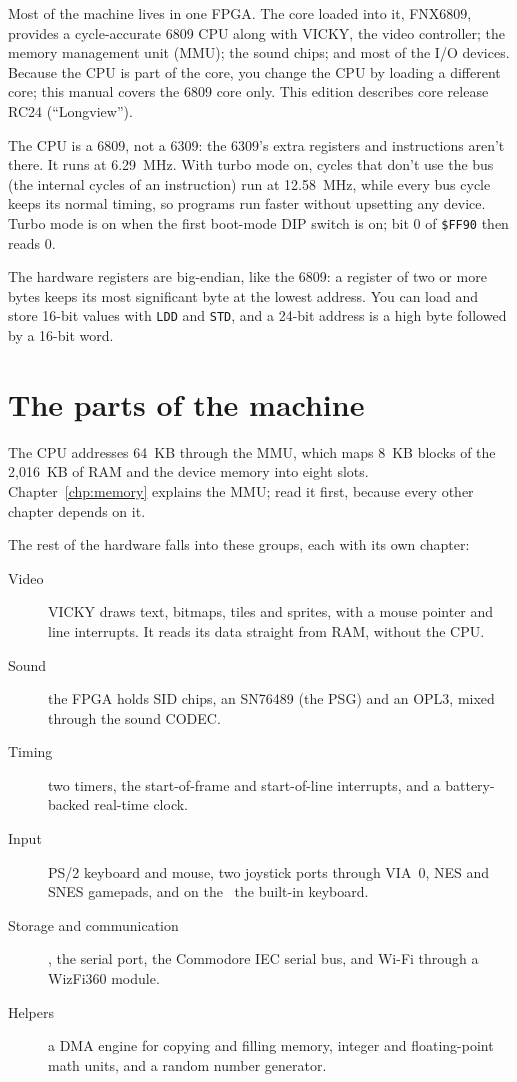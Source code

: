 Most of the machine lives in one FPGA. The core loaded into it, FNX6809, provides a cycle-accurate 6809 CPU along with VICKY, the video controller; the memory management unit (MMU); the sound chips; and most of the I/O devices. Because the CPU is part of the core, you change the CPU by loading a different core; this manual covers the 6809 core only. This edition describes core release RC24 (``Longview'').

The CPU is a 6809, not a 6309: the 6309's extra registers and instructions aren't there. It runs at 6.29~MHz. With turbo mode on, cycles that don't use the bus (the internal cycles of an instruction) run at 12.58~MHz, while every bus cycle keeps its normal timing, so programs run faster without upsetting any device. Turbo mode is on when the first boot-mode DIP switch is on; bit 0 of \verb+$FF90+ then reads 0. 

The hardware registers are big-endian, like the 6809: a register of two or more bytes keeps its most significant byte at the lowest address. You can load and store 16-bit values with \verb+LDD+ and \verb+STD+, and a 24-bit address is a high byte followed by a 16-bit word.

\section{The parts of the machine}

The CPU addresses 64~KB through the MMU, which maps 8~KB blocks of the 2,016~KB of RAM and the device memory into eight slots. Chapter~\ref{chp:memory} explains the MMU; read it first, because every other chapter depends on it.

The rest of the hardware falls into these groups, each with its own chapter:

\begin{description}
    \item[Video] VICKY draws text, bitmaps, tiles and sprites, with a mouse pointer and line interrupts. It reads its data straight from RAM, without the CPU.
    \item[Sound] the FPGA holds SID chips, an SN76489 (the PSG) and an OPL3, mixed through the sound CODEC. 
    \item[Timing] two timers, the start-of-frame and start-of-line interrupts, and a battery-backed real-time clock.
    \item[Input] PS/2 keyboard and mouse, two joystick ports through VIA~0, NES and SNES gamepads, and on the \ktwo\ the built-in keyboard.
    \item[Storage and communication] , the serial port, the Commodore IEC serial bus, and Wi-Fi through a WizFi360 module.
    \item[Helpers] a DMA engine for copying and filling memory, integer and floating-point math units, and a random number generator.
\end{description}

